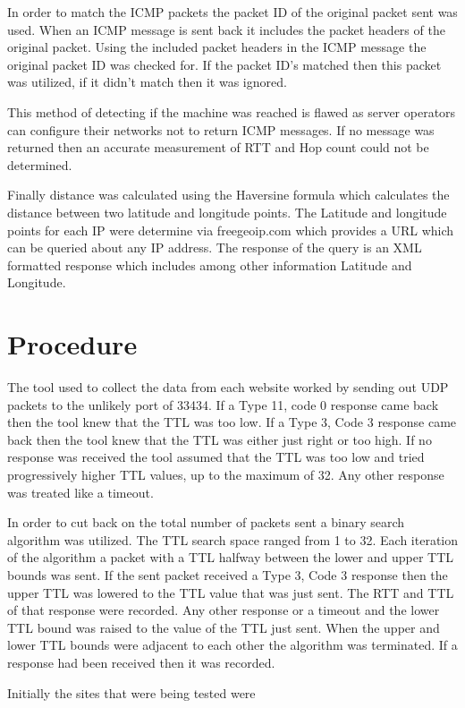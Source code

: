 \documentclass{article}
\begin{document}
In order to match the ICMP packets the packet ID of the original packet sent was used. When an ICMP message is sent back it includes the packet headers of the original packet. Using the included packet headers in the ICMP message the original packet ID was checked for. If the packet ID's matched then this packet was utilized, if it didn't match then it was ignored.

This method of detecting if the machine was reached is flawed as server operators can configure their networks not to return ICMP messages. If no message was returned then an accurate measurement of RTT and Hop count could not be determined. 

Finally distance was calculated using the Haversine formula which calculates the distance between two latitude and longitude points. The Latitude and longitude points for each IP were determine via freegeoip.com which provides a URL which can be queried about any IP address. The response of the query is an XML formatted response which includes among other information Latitude and Longitude.

\section*{Procedure}

The tool used to collect the data from each website worked by sending out UDP packets to the unlikely port of 33434. If a Type 11, code 0 response came back then the tool knew that the TTL was too low. If a Type 3, Code 3 response came back then the tool knew that the TTL was either just right or too high. If no response was received the tool assumed that the TTL was too low and tried progressively higher TTL values, up to the maximum of 32. Any other response was treated like a timeout.

In order to cut back on the total number of packets sent a binary search algorithm was utilized. The TTL search space ranged from 1 to 32. Each iteration of the algorithm a packet with a TTL halfway between the lower and upper TTL bounds was sent. If the sent packet received a Type 3, Code 3 response then the upper TTL was lowered to the TTL value that was just sent. The RTT and TTL of that response were recorded. Any other response or a timeout and the lower TTL bound was raised to the value of the TTL just sent. When the upper and lower TTL bounds were adjacent to each other the algorithm was terminated. If a response had been received then it was recorded.

Initially the sites that were being tested were
\end{document}

